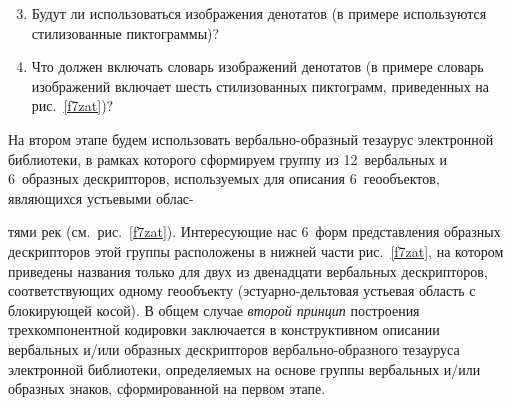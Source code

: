 \begin{multicols}{2}


\noindent
\begin{enumerate}[1.]
\setcounter{enumi}{2}
\item Будут ли использоваться изображения денотатов (в примере используются 
стилизованные пиктограммы)?\\[-15pt]
\item Что должен включать словарь изображений денотатов (в примере словарь 
изображений включает шесть стилизованных пиктограмм, приведенных на 
рис.~\ref{f7zat})?\\[-15pt]
   \end{enumerate}
   
   На втором этапе будем использовать вербально-образный тезаурус электронной 
библиотеки, в рамках которого сформируем группу из 12~вербальных и 6~образных 
дескрипторов, используемых для описания 6~геообъектов, являющихся устьевыми 
облас-\linebreak\vspace*{-9pt}\columnbreak

\noindent
тями рек (см.\ рис.~\ref{f7zat}). Интересующие нас 6~форм представления образных 
дескрипторов этой группы расположены в нижней части рис.~\ref{f7zat}, на ко\-тором 
приведены названия только для двух из\linebreak
 двенадцати вербальных дескрипторов, 
соответствующих одному геообъекту (эстуарно-дельтовая устьевая область с блокирующей 
косой). В общем случае \textit{второй принцип} построения трехкомпонентной кодировки 
заключается в конструктивном описании вербальных и/или образных дескрипторов 
вербально-образного тезауруса электронной биб\-лио\-те\-ки, определяемых на основе группы 
вербальных и/или образных знаков, сформированной на первом этапе.
 
     \begin{table*}\small %
   \begin{center}
\parbox{142mm}{
   }
   
   
   \vspace*{2ex}
   

\end{center}
\end{table*}
\end{multicols}
